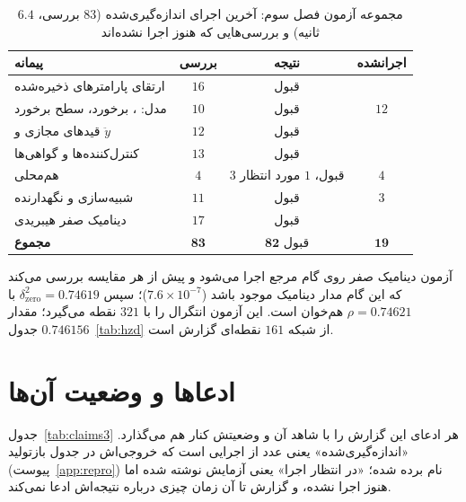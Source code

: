 \documentclass[10pt,twocolumn]{article}
\newcommand{\en}[1]{\lr{#1}}
\newcommand{\nd}{\lr{\textendash}}
\begin{document}
\begin{table}[H]
    \centering
    \caption{مجموعه آزمون فصل سوم: آخرین اجرای اندازه‌گیری‌شده ($83$ بررسی، $6.4$ ثانیه)
    و بررسی‌هایی که هنوز اجرا نشده‌اند}
    \label{tab:tests}
    \small
    \begin{tabular}{lccc}
        \toprule
        پیمانه & بررسی & نتیجه & اجرانشده \\
        \midrule
        ارتقای پارامترهای ذخیره‌شده & $16$ & قبول & \nd{} \\
        مدل: \en{KKT}، برخورد، سطح برخورد & $10$ & قبول & $12$ \\
        قیدهای مجازی و $\ddot y$ & $12$ & قبول & \nd{} \\
        کنترل‌کننده‌ها و گواهی‌ها & $13$ & قبول & \nd{} \\
        هم‌محلی & $4$ & $3$ قبول، $1$ مورد انتظار & $4$ \\
        شبیه‌سازی و نگهدارنده & $11$ & قبول & $3$ \\
        دینامیک صفر هیبریدی & $17$ & قبول & \nd{} \\
        \midrule
        \textbf{مجموع} & $\mathbf{83}$ & $\mathbf{82}$ قبول & $\mathbf{19}$ \\
        \bottomrule
    \end{tabular}
\end{table}

آزمون دینامیک صفر روی گام مرجع اجرا می‌شود و پیش از هر مقایسه بررسی می‌کند که این گام مدار
دینامیک موجود باشد ($7.6\times10^{-7}$)؛ سپس $\delta^2_{\mathrm{zero}}=0.74619$ با
$\rho=0.74621$ هم‌خوان است. این آزمون انتگرال را با $321$ نقطه می‌گیرد؛ مقدار $0.746156$
جدول~\ref{tab:hzd} از شبکه $161$ نقطه‌ای گزارش است.

\section{ادعاها و وضعیت آن‌ها}
جدول~\ref{tab:claims3} هر ادعای این گزارش را با شاهد آن و وضعیتش کنار هم می‌گذارد.
«اندازه‌گیری‌شده» یعنی عدد از اجرایی است که خروجی‌اش در جدول بازتولید
(پیوست~\ref{app:repro}) نام برده شده؛ «در انتظار اجرا» یعنی آزمایش نوشته شده اما هنوز
اجرا نشده، و گزارش تا آن زمان چیزی درباره نتیجه‌اش ادعا نمی‌کند.
\end{document}
